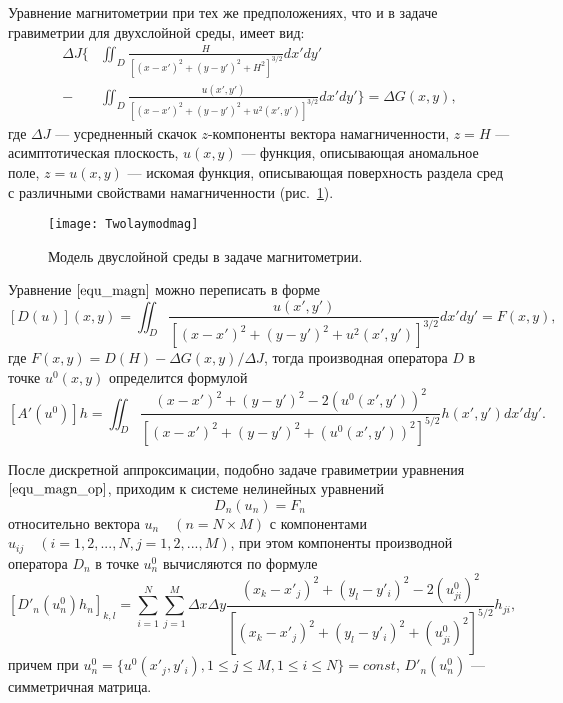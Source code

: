 Уравнение магнитометрии при тех же предположениях, что и в задаче гравиметрии для двухслойной среды, имеет вид:
\begin{equation}\label{equ_magn}\begin{aligned}
\Delta J  \bigg\{&\iint_{D} \frac{H}{[(x-x')^2+(y-y')^2+H^2]^{3/2}}dx'dy' \\
- &\iint_{D} \frac{u(x',y')}{[(x-x')^2+(y-y')^2+u^2(x',y')]^{3/2}}dx'dy' \bigg\}=\Delta G(x,y),
\end{aligned} \end{equation}
где $\Delta J$ --- усредненный скачок $z$-компоненты вектора намагниченности, $z=H$ --- асимптотическая плоскость, $u(x,y)$ --- функция, описывающая аномальное поле, $z=u(x,y)$ --- искомая функция, описывающая поверхность раздела сред с различными свойствами намагниченности (рис.~\ref{fig:twolayermag}). 
\begin{figure}[H]
	\centering
	\texttt{[image: Twolaymodmag]}
	\caption{Модель двуслойной среды в задаче магнитометрии.}
	\label{fig:twolayermag}
\end{figure}
Уравнение $\eqref{equ_magn}$ можно переписать в форме
\begin{equation}\label{equ_magn_op}
[D(u)](x,y)= \iint_{D} \frac{u(x',y')}{[(x-x')^2+(y-y')^2+u^2(x',y')]^{3/2}}dx'dy'=F(x,y),
\end{equation}
где $F(x,y)=D(H)-\Delta G(x,y)/\Delta J$, тогда производная оператора $D$ в точке $u^0(x,y)$ определится формулой
$$ [A'(u^0)]h=\iint_{D} \frac{(x-x')^2+(y-y')^2-2(u^0(x',y'))^2}{[(x-x')^2+(y-y')^2+(u^0(x',y'))^2]^{5/2}}h(x',y')dx'dy'. $$

После дискретной аппроксимации, подобно задаче гравиметрии уравнения $\eqref{equ_magn_op}$, приходим к системе нелинейных уравнений
\begin{equation}\label{equ_snle_mag}
D_n(u_n)=F_n
\end{equation}
относительно вектора $u_n \quad (n=N\times M)$ с компонентами $u_{ij}\quad (i=1,2,...,N, j=1,2,...,M)$, при этом компоненты производной оператора $D_n$ в точке $u_{n}^{0}$ вычисляются по формуле
\begin{equation}\label{deriv_op_mag}
[D'_n(u_{n}^{0})h_n]_{k,l}=\sum\limits_{i=1}^{N}\sum\limits_{j=1}^{M}
\Delta x\Delta y\frac{(x_k-x'_j)^2+(y_l-y'_i)^2-2(u_{ji}^0)^2}{[(x_k-x'_j)^2+(y_l-y'_i)^2+(u_{ji}^0)^2]^{5/2}}h_{ji}, 
\end{equation}
причем при $u_{n}^{0}=\{u^0(x'_j, y'_i), 1\le j\le M, 1\le i\le N\}=const$, $D'_n(u_n^0)$ --- симметричная матрица.

